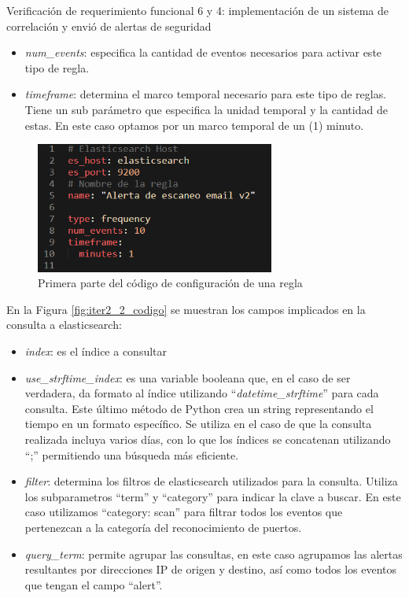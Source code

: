 \begin{section}{Verificación de requerimiento funcional 6 y 4: implementación de un sistema de correlación y envió de alertas de seguridad}
\begin{itemize}
        \item \textit{num\_events}: especifica la cantidad de eventos necesarios para activar este tipo de regla.
        \item \textit{timeframe}: determina el marco temporal necesario para este tipo de reglas. Tiene un sub parámetro que especifica la unidad temporal y la cantidad de estas. En este caso optamos por un marco temporal de un (1) minuto.
    \end{itemize}
    \begin{figure}[H]
    \centering
        \includegraphics[width=0.7\textwidth]{./iteracion_2_imagenes/3-codigoAlerta-1.png}
        \caption{Primera parte del código de configuración de una regla}
        \label{fig:iter2_1_codigo}
    \end{figure}
    \FloatBarrier
    En la Figura \ref{fig:iter2_2_codigo} se muestran los campos implicados en la consulta a elasticsearch:
    \begin{itemize}
        \item \textit{index}: es el índice a consultar
        \item \textit{use\_strftime\_index}: es una variable booleana que, en el caso de ser verdadera, da formato al índice utilizando “\textit{datetime\_strftime}” para cada consulta. Este último método de Python crea un string representando el tiempo en un formato específico. Se utiliza en el caso de que la consulta realizada incluya varios días, con lo que los índices se concatenan utilizando “;” permitiendo una búsqueda más eficiente.
        \item \textit{filter}: determina los filtros de elasticsearch utilizados para la consulta. Utiliza los subparametros “term”  y “category” para indicar la clave a buscar. En este caso utilizamos “category: scan” para filtrar todos los eventos que pertenezcan a la categoría del reconocimiento de puertos.
        \item \textit{query\_term}: permite agrupar las consultas, en este caso agrupamos las alertas resultantes por direcciones IP de origen y destino, así como todos los eventos que tengan el campo “alert”.

\end{itemize}
\end{section}

